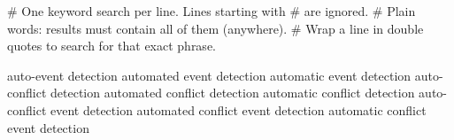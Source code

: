 # One keyword search per line. Lines starting with # are ignored.
# Plain words: results must contain all of them (anywhere).
# Wrap a line in double quotes to search for that exact phrase.

auto-event detection 
automated event detection 
automatic event detection 
auto-conflict detection 
automated conflict detection 
automatic conflict detection 
auto-conflict event detection 
automated conflict event detection 
automatic conflict event detection 
